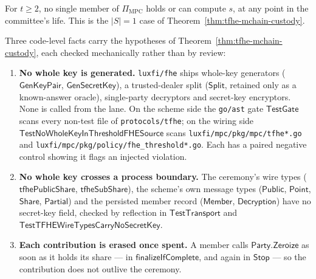 \begin{corollary}
\label{cor:tfhe-no-member-holds-key}
For $t \ge 2$, no single member of $\Pi_{\mathrm{MPC}}$ holds or can compute
$s$, at any point in the committee's life. This is the $|S| = 1$ case of
Theorem~\ref{thm:tfhe-mchain-custody}.
\end{corollary}

\begin{remark}
\label{rem:tfhe-custody-enforcement}
Three code-level facts carry the hypotheses of
Theorem~\ref{thm:tfhe-mchain-custody}, each checked mechanically rather than
by review:
\begin{enumerate}[nosep]
  \item \textbf{No whole key is generated.} \texttt{luxfi/fhe} ships whole-key
        generators ($\mathsf{GenKeyPair}$, $\mathsf{GenSecretKey}$), a
        trusted-dealer split ($\mathsf{Split}$, retained only as a
        known-answer oracle), single-party decryptors and secret-key
        encryptors. None is called from the lane. On the scheme side the
        \texttt{go/ast} gate $\mathsf{TestGate}$
        scans every non-test file of \texttt{protocols/tfhe}; on the wiring
        side $\mathsf{TestNoWholeKeyInThresholdFHESource}$ scans
        \texttt{luxfi/mpc/pkg/mpc/tfhe*.go} and
        \texttt{luxfi/mpc/pkg/policy/fhe\_threshold*.go}. Each has a paired
        negative control showing it flags an injected violation.
  \item \textbf{No whole key crosses a process boundary.} The ceremony's wire
        types ($\mathsf{tfhePublicShare}$, $\mathsf{tfheSubShare}$), the
        scheme's own message types ($\mathsf{Public}$,
        $\mathsf{Point}$, $\mathsf{Share}$,
        $\mathsf{Partial}$) and the persisted member record
        ($\mathsf{Member}$, $\mathsf{Decryption}$) have no secret-key field,
        checked by reflection in
        $\mathsf{TestTransport}$ and
        $\mathsf{TestTFHEWireTypesCarryNoSecretKey}$.
  \item \textbf{Each contribution is erased once spent.} A member calls
        $\mathsf{Party.Zeroize}$ as soon as it holds its share ---
        in $\mathsf{finalizeIfComplete}$, and again in $\mathsf{Stop}$ --- so
        the contribution does not outlive the ceremony.
\end{enumerate}
\end{remark}


